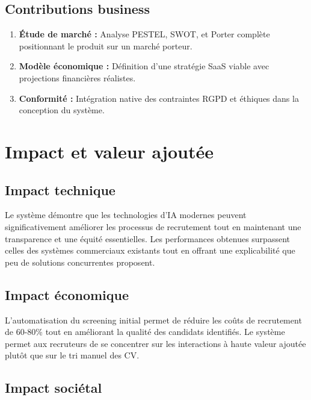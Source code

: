 \documentclass[12pt,a4paper]{report}
\begin{document}
\subsection{Contributions business}

\begin{enumerate}
\item {\color{primarygreen}\textbf{Étude de marché :}} Analyse PESTEL, SWOT, et Porter complète positionnant le produit sur un marché porteur.

\item {\color{darkgreen}\textbf{Modèle économique :}} Définition d'une stratégie SaaS viable avec projections financières réalistes.

\item {\color{primarygreen}\textbf{Conformité :}} Intégration native des contraintes RGPD et éthiques dans la conception du système.
\end{enumerate}

\section{Impact et valeur ajoutée}

\subsection{Impact technique}

Le système démontre que les technologies d'IA modernes peuvent significativement améliorer les processus de recrutement tout en maintenant une transparence et une équité essentielles. Les performances obtenues surpassent celles des systèmes commerciaux existants tout en offrant une explicabilité que peu de solutions concurrentes proposent.

\subsection{Impact économique}

L'automatisation du screening initial permet de réduire les coûts de recrutement de 60-80\% tout en améliorant la qualité des candidats identifiés. Le système permet aux recruteurs de se concentrer sur les interactions à haute valeur ajoutée plutôt que sur le tri manuel des CV.

\subsection{Impact sociétal}
\end{document}
